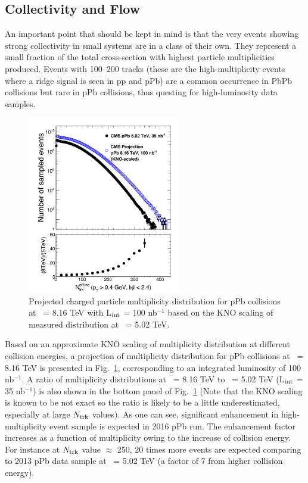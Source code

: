 \subsection{Collectivity and Flow}

An important point that should be kept in mind is that the very events
showing strong collectivity in small systems are in a class of their own.
They represent a small fraction of the total cross-section with highest particle
multiplicities produced. Events with 100--200 tracks (these are the high-multiplicity 
events where a ridge signal is seen in pp and pPb) are a common occurrence in
PbPb collisions but rare in pPb collisions, thus questing for high-luminosity data samples.

\begin{figure}[t!]
  \begin{center}
    \includegraphics[width=0.6\textwidth]{figures/Ntrk.pdf}
    \caption{ Projected charged particle multiplicity distribution for pPb 
    collisions at \rootsNN\ = 8.16 TeV with L$_{\rm int}$ = 100 nb$^{-1}$
    based on the KNO scaling of measured distribution at \rootsNN\ = 5.02 TeV.
    }
    \label{fig:Ntrk_pPb}
  \end{center}
\end{figure}

Based on an approximate KNO scaling of multiplicity distribution at different collision 
energies, a projection of multiplicity distribution for pPb collisions at \rootsNN\ = 8.16 
TeV is presented in Fig.~\ref{fig:Ntrk_pPb}, corresponding to an integrated luminosity 
of 100 nb$^{-1}$. A ratio of multiplicity distributions at \rootsNN\ = 8.16 TeV 
to \rootsNN\ = 5.02 TeV (L$_{\rm int}$ = 35 nb$^{-1}$) is also shown in the bottom panel of Fig.~\ref{fig:Ntrk_pPb} (Note that the KNO scaling is known to be not exact so the ratio 
is likely to be a little underestimated, especially at large $N_{\rm trk}$ values). 
As one can see, significant enhancement in high-multiplicity event sample is expected 
in 2016 pPb run. The enhancement factor increases as a function of multiplicity owing 
to the increase of collision energy. For instance at $N_{\rm trk}$ value $\approx$ 250, 
20 times more events are expected comparing to 2013 pPb data sample at \rootsNN\ = 5.02 TeV
(a factor of 7 from higher collision energy).

